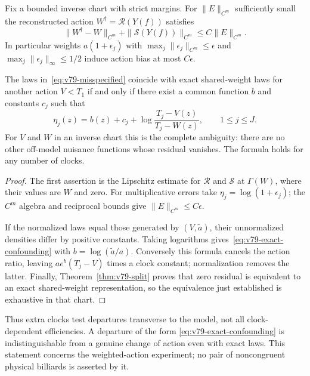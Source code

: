 \begin{theorem}
\label{thm:v79-nuisance}
Fix a bounded inverse chart with strict margins.  For
$\|E\|_{C^m}$ sufficiently small the reconstructed action
$W^\dagger=\mathcal R(Y(f))$ satisfies
\begin{equation}\label{eq:v79-bias}
 \|W^\dagger-W\|_{C^m}
          +\|\mathcal S(Y(f))\|_{C^m}\le C\|E\|_{C^m}.
\end{equation}
In particular weights $a(1+\epsilon_j)$ with
$\max_j\|\epsilon_j\|_{C^m}\le\epsilon$ and
$\max_j\|\epsilon_j\|_\infty\le1/2$ induce action bias at most
$C\epsilon$.

The laws in~\eqref{eq:v79-misspecified} coincide with exact
shared-weight laws for another action $V<T_1$ if and only if there
exist a common function $b$ and constants $c_j$ such that
\begin{equation}\label{eq:v79-exact-confounding}
 \eta_j(z)=b(z)+c_j+
           \log\frac{T_j-V(z)}{T_j-W(z)},\qquad 1\le j\le J.
\end{equation}
For $V$ and $W$ in an inverse chart this is the complete ambiguity:
there are no other off-model nuisance functions whose residual vanishes.
The formula holds for any number of clocks.
\end{theorem}
\begin{proof}
The first assertion is the Lipschitz estimate for $\mathcal R$ and
$\mathcal S$ at $\Gamma(W)$, where their values are $W$ and zero.
For multiplicative errors take $\eta_j=\log(1+\epsilon_j)$;
the $C^m$ algebra and reciprocal bounds give
$\|E\|_{C^m}\le C\epsilon$.

If the normalized laws equal those generated by $(V,\widetilde a)$,
their unnormalized densities differ by positive constants.  Taking
logarithms gives~\eqref{eq:v79-exact-confounding} with
$b=\log(\widetilde a/a)$.  Conversely this formula cancels the action
ratio, leaving $ae^b(T_j-V)$ times a clock constant; normalization
removes the latter.  Finally, Theorem~\ref{thm:v79-split} proves that
zero residual is equivalent to an exact shared-weight representation,
so the equivalence just established is exhaustive in that chart.
\end{proof}

Thus extra clocks test departures transverse to the model, not all
clock-dependent efficiencies.  A departure of the form
\eqref{eq:v79-exact-confounding} is indistinguishable from a genuine
change of action even with exact laws.  This statement concerns the
weighted-action experiment; no pair of noncongruent physical billiards
is asserted by it.

